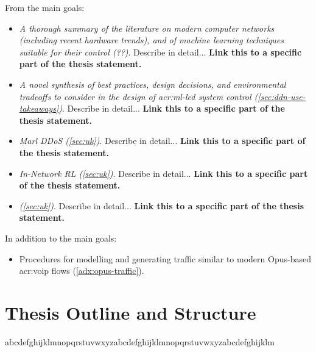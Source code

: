 From the main goals:
\begin{itemize}
	\item \emph{A thorough summary of the literature on modern computer networks (including recent hardware trends), and of machine learning techniques suitable for their control (??)}. Describe in detail... \textbf{Link this to a specific part of the thesis statement.}
	\item \emph{A novel synthesis of best practices, design decisions, and environmental tradeoffs to consider in the design of \gls{acr:ml}-led system control (\cref{sec:ddn-use-takeaways})}. Describe in detail... \textbf{Link this to a specific part of the thesis statement.}
	\item \emph{Marl DDoS (\cref{sec:uk})}. Describe in detail... \textbf{Link this to a specific part of the thesis statement.}
	\item \emph{In-Network RL (\cref{sec:uk})}. Describe in detail... \textbf{Link this to a specific part of the thesis statement.}
	\item \emph{\seidr{} (\cref{sec:uk})}. Describe in detail... \textbf{Link this to a specific part of the thesis statement.}
\end{itemize}

In addition to the main goals:
\begin{itemize}
	\item Procedures for modelling and generating traffic similar to modern Opus-based \gls{acr:voip} flows (\cref{adx:opus-traffic}).
\end{itemize}

\section{Thesis Outline and Structure}

abcdefghijklmnopqrstuvwxyzabcdefghijklmnopqrstuvwxyzabcdefghijklm